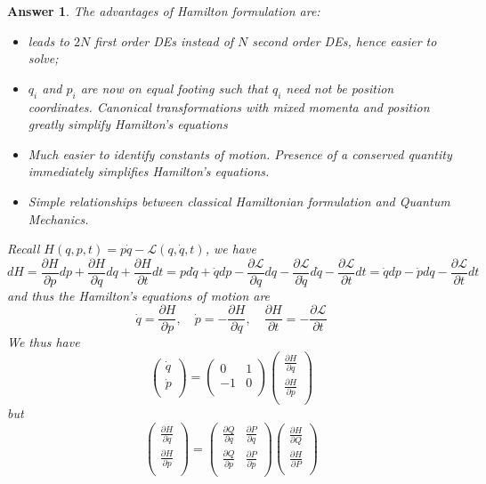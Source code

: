 \documentclass[a4paper]{article}
\newtheorem{ans}{Answer}[subsection]
\theoremstyle{new}
\begin{document}
\begin{ans}
The advantages of Hamilton formulation are:
\begin{itemize}
    \item leads to $2N$ first order DEs instead of $N$ second order DEs, hence easier to solve;
    \item $q_i$ and $p_i$ are now on equal footing such that $q_i$ need not be position coordinates. Canonical transformations with mixed momenta and position greatly simplify Hamilton's equations
    \item Much easier to identify constants of motion. Presence of a conserved quantity immediately simplifies Hamilton's equations.
    \item Simple relationships between classical Hamiltonian formulation and Quantum Mechanics. 
\end{itemize}
Recall $H(q,p,t)=p\dot{q}-\mathcal{L}(q,\dot{q},t)$, we have
$$dH=\frac{\partial H}{\partial p}dp+\frac{\partial H}{\partial q}dq+\frac{\partial H}{\partial t}dt=pd\dot{q}+\dot{q}dp-\frac{\partial\mathcal{L}}{\partial q}dq-\frac{\partial\mathcal{L}}{\partial\dot{q}}d\dot{q}-\frac{\partial\mathcal{L}}{\partial t}dt=\dot{q}dp-\dot{p}dq-\frac{\partial\mathcal{L}}{\partial t}dt$$
and thus the Hamilton's equations of motion are
$$\dot{q}=\frac{\partial H}{\partial p},\quad\dot{p}=-\frac{\partial H}{\partial q},\quad\frac{\partial H}{\partial t}=-\frac{\partial\mathcal{L}}{\partial t}$$
We thus have
$$\begin{pmatrix}\dot{q}\\\dot{p}\\\end{pmatrix}=\begin{pmatrix}0&1\\-1&0\\\end{pmatrix}\begin{pmatrix}\frac{\partial H}{\partial q}\\\frac{\partial H}{\partial p}\\\end{pmatrix}$$
but
$$\begin{pmatrix}\frac{\partial H}{\partial q}\\\frac{\partial H}{\partial p}\\\end{pmatrix}=\begin{pmatrix}\frac{\partial Q}{\partial q}&\frac{\partial P}{\partial q}\\\frac{\partial Q}{\partial p}&\frac{\partial P}{\partial p}\\\end{pmatrix}\begin{pmatrix}\frac{\partial H}{\partial Q}\\\frac{\partial H}{\partial P}\\\end{pmatrix}$$

\end{ans}
\end{document}
